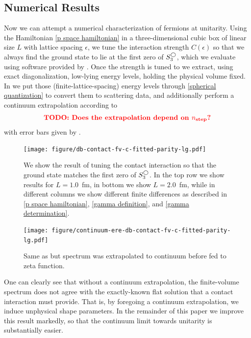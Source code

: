 \subsection{Numerical Results}

Now we can attempt a numerical characterization of fermions at unitarity.
Using the Hamiltonian \eqref{p space hamiltonian} in a three-dimensional cubic box of linear size $L$ with lattice spacing $\epsilon$, we tune the interaction strength $C(\epsilon)$ so that we always find the ground state to lie at the first zero of $S^{\bigcirc}_3$, which we evaluate using software provided by .
Once the strength is tuned to  we extract, using exact diagonalization, low-lying energy levels, holding the physical volume fixed.
In  we put those (finite-lattice-spacing) energy levels through \eqref{spherical quantization} to convert them to scattering data, and additionally perform a continuum extrapolation according to
\begin{equation}
    \text{{\bf\color{red}TODO: Does the extrapolation depend on \ensuremath{{n_\text{step}}}?}}
\end{equation}
with error bars given by .  

\begin{figure}[th]
    \texttt{[image: figure/db-contact-fv-c-fitted-parity-lg.pdf]}
    \caption{We show the result of tuning the contact interaction so that the ground state matches the first zero of $S^{\bigcirc}_3$.  In the top row we show results for $L=1.0$~fm, in bottom we show $L=2.0$~fm, while in different columns we show different finite differences as described in \eqref{p space hamiltonian}, \eqref{gamma definition}, and \eqref{gamma determination}. }
    \label{fig:unimproved spherical}
\end{figure}

\begin{figure}[th]
    \texttt{[image: figure/continuum-ere-db-contact-fv-c-fitted-parity-lg.pdf]}
    \caption{Same as  but spectrum was extrapolated to continuum before fed to zeta function.}
    \label{fig:unimproved spherical continuum extrapolation}
\end{figure}

One can clearly see that without a continuum extrapolation, the finite-volume spectrum does not agree with the exactly-known flat solution that a contact interaction must provide.
That is, by foregoing a continuum extrapolation, we induce unphysical shape parameters.
In the remainder of this paper we improve this result markedly, so that the continuum limit towards unitarity is substantially easier.

